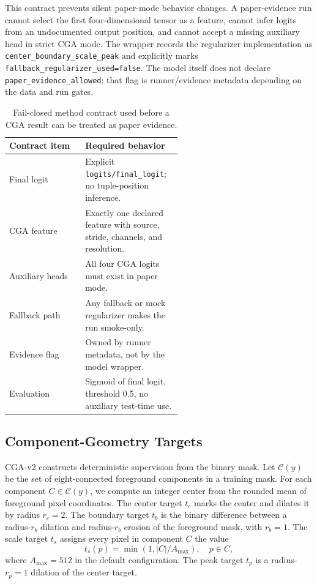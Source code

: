 \documentclass[letterpaper]{article}
\begin{document}
This contract prevents silent paper-mode behavior changes. A paper-evidence run cannot select the first four-dimensional tensor as a feature, cannot infer logits from an undocumented output position, and cannot accept a missing auxiliary head in strict CGA mode. The wrapper records the regularizer implementation as \texttt{center\_boundary\_scale\_peak} and explicitly marks \texttt{fallback\_regularizer\_used=false}. The model itself does not declare \texttt{paper\_evidence\_allowed}; that flag is runner/evidence metadata depending on the data and run gates.

\begin{table}[t]
\centering
\caption{Fail-closed method contract used before a CGA result can be treated as paper evidence.}
\label{tab:contract}
\small
\begin{tabular}{lp{0.56\linewidth}}
\toprule
Contract item & Required behavior \\
\midrule
Final logit & Explicit \texttt{logits/final\_logit}; no tuple-position inference. \\
CGA feature & Exactly one declared feature with source, stride, channels, and resolution. \\
Auxiliary heads & All four CGA logits must exist in paper mode. \\
Fallback path & Any fallback or mock regularizer makes the run smoke-only. \\
Evidence flag & Owned by runner metadata, not by the model wrapper. \\
Evaluation & Sigmoid of final logit, threshold 0.5, no auxiliary test-time use. \\
\bottomrule
\end{tabular}
\end{table}

\subsection{Component-Geometry Targets}

CGA-v2 constructs deterministic supervision from the binary mask. Let $\mathcal{C}(y)$ be the set of eight-connected foreground components in a training mask. For each component $C \in \mathcal{C}(y)$, we compute an integer center from the rounded mean of foreground pixel coordinates. The center target $t_c$ marks the center and dilates it by radius $r_c=2$. The boundary target $t_b$ is the binary difference between a radius-$r_b$ dilation and radius-$r_b$ erosion of the foreground mask, with $r_b=1$. The scale target $t_s$ assigns every pixel in component $C$ the value
\begin{equation}
t_s(p) = \min(1, |C| / A_{\max}), \quad p \in C,
\end{equation}
where $A_{\max}=512$ in the default configuration. The peak target $t_p$ is a radius-$r_p=1$ dilation of the center target.
\end{document}
